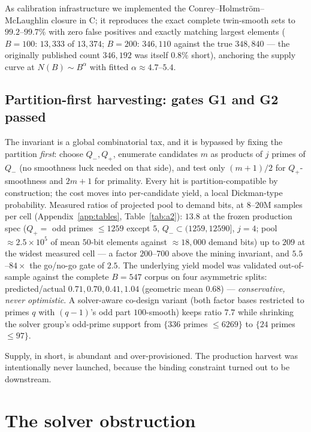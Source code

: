 \documentclass[11pt]{article}
\theoremstyle{remark}
\begin{document}
As calibration infrastructure we implemented the
Conrey--Holmstr\"om--McLaughlin closure \cite{CHM13,BCCEMNS23} in C; it
reproduces the exact complete twin-smooth sets to $99.2$--$99.7\%$ with
zero false positives and exactly matching largest elements ($B = 100$:
$13{,}333$ of $13{,}374$; $B = 200$: $346{,}110$ against the true
$348{,}840$ --- the originally published count $346{,}192$ was itself
$0.8\%$ short), anchoring the supply curve at $N(B) \sim B^{\alpha}$ with
fitted $\alpha \approx 4.7$--$5.4$.

\subsection{Partition-first harvesting: gates G1 and G2 passed}

The invariant is a global combinatorial tax, and it is bypassed by fixing
the partition \emph{first}: choose $Q_-, Q_+$, enumerate candidates $m$ as
products of $j$ primes of $Q_-$ (no smoothness luck needed on that side),
and test only $(m+1)/2$ for $Q_+$-smoothness and $2m+1$ for primality.
Every hit is partition-compatible by construction; the cost moves into
per-candidate yield, a local Dickman-type probability. Measured ratios of
projected pool to demand bits, at $8$--$20$M samples per cell
(Appendix~\ref{app:tables}, Table~\ref{tab:a2}): $13.8$ at the frozen
production spec ($Q_+ =$ odd primes $\le 1259$ except $5$, $Q_- \subset
(1259, 12590]$, $j = 4$; pool $\approx 2.5 \times 10^5$ of mean $50$-bit
elements against $\approx 18{,}000$ demand bits) up to $209$ at the widest
measured cell --- a factor $200$--$700$ above the mining invariant, and
$5.5$--$84\times$ the go/no-go gate of $2.5$. The underlying yield model
was validated out-of-sample against the complete $B = 547$ corpus on four
asymmetric splits: predicted/actual $0.71, 0.70, 0.41, 1.04$ (geometric
mean $0.68$) --- \emph{conservative, never optimistic}. A solver-aware
co-design variant (both factor bases restricted to primes $q$ with
$(q-1)$'s odd part $100$-smooth) keeps ratio $7.7$ while shrinking the
solver group's odd-prime support from $\{336$ primes $\le 6269\}$ to
$\{24$ primes $\le 97\}$.

Supply, in short, is abundant and over-provisioned. The production harvest
was intentionally never launched, because the binding constraint turned
out to be downstream.

\section{The solver obstruction}\label{sec:solver}
\end{document}
